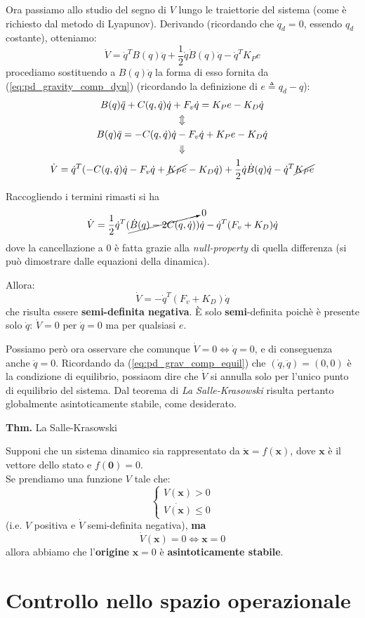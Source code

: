 Ora passiamo allo studio del segno di $V$ lungo le traiettorie del sistema (come è richiesto dal metodo di Lyapunov). Derivando (ricordando che $\dot{q}_d = 0$, essendo $q_d$ costante), otteniamo:
$$
\dot{V} = \dot{q}^TB(q)\ddot{q} + \frac{1}{2}\dot{q}\dot{B}(q)\dot{q} - \dot{q}^TK_Pe
$$
procediamo sostituendo a $B(q)\ddot{q}$ la forma di esso fornita da (\ref{eq:pd_gravity_comp_dyn}) (ricordando la definizione di $e \triangleq q_d - q$):
\begin{gather*}
	B(q)\ddot{q} + C(q, \dot{q})\dot{q} + F_v\dot{q} = K_Pe - K_D\dot{q} \\
	\Updownarrow \\
	B(q)\ddot{q} = -C(q, \dot{q})\dot{q} - F_v\dot{q} + K_Pe - K_D\dot{q} \\
	\Downarrow \\
	\dot{V} = \dot{q}^T( -C(q, \dot{q})\dot{q} - F_v\dot{q} + \cancel{K_Pe} - K_D\dot{q} ) + \frac{1}{2}\dot{q}\dot{B}(q)\dot{q} - \dot{q}^T \cancel{K_Pe}
\end{gather*}

Raccogliendo i termini rimasti si ha
$$
\dot{V} = \frac{1}{2} \dot{q}^T ( \cancelto{0}{ \dot{B}(q) - 2C(q, \dot{q}) })\dot{q} - \dot{q}^T (F_v + K_D)\dot{q}
$$
dove la cancellazione a 0 è fatta grazie alla \textit{null-property} di quella differenza (si può dimostrare dalle equazioni della dinamica).

Allora:
$$
\dot{V} = - \dot{q}^T (F_v + K_D)\dot{q}
$$
che risulta essere \textbf{semi-definita negativa}. È solo \textbf{semi}-definita poichè è presente solo $\dot{q}$: $\dot{V} = 0$ per $\dot{q} = 0$ ma per qualsiasi $e$.

Possiamo però ora osservare che comunque $\dot{V} = 0 \iff \dot{q} = 0$, e di conseguenza anche $\ddot{q} = 0$. Ricordando da (\ref{eq:pd_grav_comp_equil}) che $(\dot{q}, \ddot{q}) = (0,0)$ è la condizione di equilibrio, possiaom dire che $\dot{V}$ si annulla solo per l'unico punto di equilibrio del sistema.
Dal teorema di \textit{La Salle-Krasowski} risulta pertanto globalmente asintoticamente stabile, come desiderato.
\unboldmath

\vspace{15pt}
\begin{addendum}
\textbf{Thm.} La Salle-Krasowski

Supponi che un sistema dinamico sia rappresentato da $\dot{\mathbf{x}}=f(\mathbf{x})$, dove $\mathbf{x}$ è il vettore dello stato e $f(\mathbf{0})=0$.\\
Se prendiamo una funzione $V$ tale che:
$$
\begin{cases}
	V(\mathbf{x}) > 0 \\
	\dot{V(\mathbf{x})} \leq 0
\end{cases}
$$
(i.e. $V$ positiva e $\dot{V}$ semi-definita negativa), \textbf{ma}
$$
\dot{V}(\mathbf{x}) = 0 \iff \mathbf{x} = 0
$$
allora abbiamo che l'\textbf{origine} $\mathbf{x} = 0$ è \textbf{asintoticamente stabile}.
\end{addendum}










\section{Controllo nello spazio operazionale}